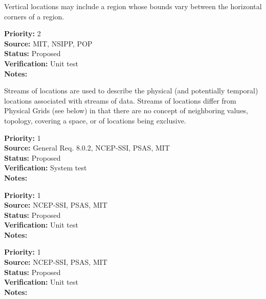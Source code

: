 
  Vertical locations may include a region whose bounds vary between the
horizontal corners of a region.
\begin{reqlist}
{\bf Priority:} 2 \\
{\bf Source:} MIT, NSIPP, POP \\
{\bf Status:} Proposed \\
{\bf Verification:} Unit test\\
{\bf Notes:} 
\end{reqlist}


Streams of locations are used to describe the physical (and potentially temporal)
locations associated with streams of data.  Streams of locations differ from
Physical Grids (see below) in that there are no concept of neighboring values,
topology, covering a space, or of locations being exclusive.
\begin{reqlist}
{\bf Priority:} 1 \\
{\bf Source:} General Req. 8.0.2, NCEP-SSI,
              PSAS, MIT \\
{\bf Status:} Proposed \\
{\bf Verification:} System test\\
{\bf Notes:} 
\end{reqlist}

\begin{reqlist}
{\bf Priority:} 1 \\
{\bf Source:} NCEP-SSI, PSAS, MIT \\
{\bf Status:} Proposed \\
{\bf Verification:} Unit test \\
{\bf Notes:} 
\end{reqlist}

\begin{reqlist}
{\bf Priority:} 1 \\
{\bf Source:} NCEP-SSI, PSAS, MIT \\
{\bf Status:} Proposed \\
{\bf Verification:} Unit test \\
{\bf Notes:} 
\end{reqlist}

